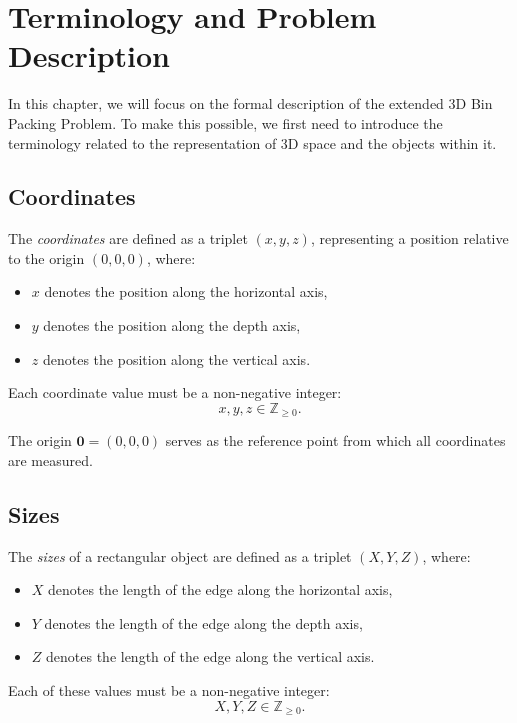 \chapter{Terminology and Problem Description}
\label{chap:problem}

In this chapter, we will focus on the formal description of the extended 3D Bin Packing Problem.
To make this possible, we first need to introduce the terminology related to the representation of 3D space and the objects within it.



\section{Coordinates}

The \textit{coordinates} are defined as a triplet $(x, y, z)$, representing a position relative to the origin $(0, 0, 0)$, where:
\begin{itemize}
    \item $x$ denotes the position along the horizontal axis,
    \item $y$ denotes the position along the depth axis,
    \item $z$ denotes the position along the vertical axis.
\end{itemize}

Each coordinate value must be a non-negative integer:
\[
x, y, z \in \mathbb{Z}_{\geq 0}.
\]

The origin $\mathbf{0} = (0, 0, 0)$ serves as the reference point from which all coordinates are measured.



\section{Sizes}

The \textit{sizes} of a rectangular object are defined as a triplet $(X, Y, Z)$, where:

\begin{itemize}
    \item $X$ denotes the length of the edge along the horizontal axis,
    \item $Y$ denotes the length of the edge along the depth axis,
    \item $Z$ denotes the length of the edge along the vertical axis. 
\end{itemize}

Each of these values must be a non-negative integer:
\[
X, Y, Z \in \mathbb{Z}_{\geq 0}.
\]




